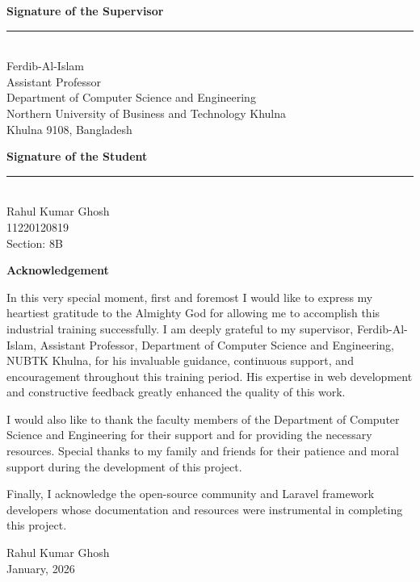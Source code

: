 \documentclass[12pt,a4paper]{report}
\newcommand{\JustifiedNormal}{\fontsize{12}{14}\selectfont\justifying\setlength{\parindent}{0pt}}
\begin{document}
\vspace{3em}
\noindent
\begin{minipage}[t]{0.7\textwidth}
\textbf{Signature of the Supervisor}\\[2em]
\rule{6cm}{0.4pt}\\
Ferdib-Al-Islam\\
Assistant Professor\\
Department of Computer Science and Engineering\\
Northern University of Business and Technology Khulna\\
Khulna 9108, Bangladesh
\end{minipage}
\hfill
\begin{minipage}[t]{0.45\textwidth}
\textbf{Signature of the Student}\\[2em]
\rule{6cm}{0.4pt}\\
Rahul Kumar Ghosh\\
11220120819\\
Section: 8B
\end{minipage}

\clearpage

\begin{center}
  {\fontsize{14}{17}\selectfont\bfseries Acknowledgement}
\end{center}
\vspace{2em}
\JustifiedNormal
In this very special moment, first and foremost I would like to express my heartiest gratitude to the Almighty God for allowing me to accomplish this industrial training successfully. I am deeply grateful to my supervisor, Ferdib-Al-Islam, Assistant Professor, Department of Computer Science and Engineering, NUBTK Khulna, for his invaluable guidance, continuous support, and encouragement throughout this training period. His expertise in web development and constructive feedback greatly enhanced the quality of this work.

I would also like to thank the faculty members of the Department of Computer Science and Engineering for their support and for providing the necessary resources. Special thanks to my family and friends for their patience and moral support during the development of this project.

Finally, I acknowledge the open-source community and Laravel framework developers whose documentation and resources were instrumental in completing this project.

\vspace{2em}
\begin{flushright}
Rahul Kumar Ghosh\\
January, 2026
\end{flushright}
\end{document}
